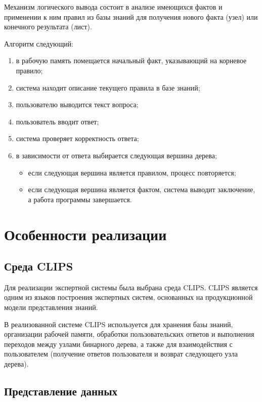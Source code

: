 \documentclass[14pt,a4paper]{extarticle}
\begin{document}
Механизм логического вывода состоит в анализе имеющихся фактов и применении к ним правил из базы знаний для получения нового факта (узел) или конечного результата (лист).

Алгоритм следующий:

\begin{enumerate}
    \item в рабочую память помещается начальный факт, указывающий на корневое правило;
    \item система находит описание текущего правила в базе знаний;
    \item пользователю выводится текст вопроса;
    \item пользователь вводит ответ;
    \item система проверяет корректность ответа;
    \item в зависимости от ответа выбирается следующая вершина дерева;
    \begin{itemize}
        \item если следующая вершина является правилом, процесс повторяется;
        \item если следующая вершина является фактом, система выводит заключение, а работа программы завершается.
    \end{itemize}
\end{enumerate}

\newpage

\section{Особенности реализации}

\subsection{Среда CLIPS}

Для реализации экспертной системы была выбрана среда CLIPS. CLIPS является одним из языков построения экспертных систем, основанных на продукционной модели представления знаний. 

В реализованной системе CLIPS используется для хранения базы знаний, организации рабочей памяти, обработки пользовательских ответов и выполнения переходов между узлами бинарного дерева, а также для взаимодействия с пользователем (получение ответов пользователя и возврат следующего узла дерева).

\subsection{Представление данных}
\end{document}
